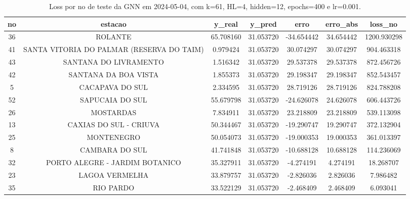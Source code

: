\begin{table}[h]
\centering
\caption{Loss por no de teste da GNN em 2024-05-04, com k=61, HL=4, hidden=12, epochs=400 e lr=0.001.}
\label{tab:gnn_loss_k61_hl4_h12_e400_d20240504}
\begin{tabular}{ccccccc}
\toprule
no & estacao & y\_real & y\_pred & erro & erro\_abs & loss\_no \\
\midrule
36 & ROLANTE & 65.708160 & 31.053720 & -34.654442 & 34.654442 & 1200.930298 \\
41 & SANTA VITORIA DO PALMAR (RESERVA DO TAIM) & 0.979424 & 31.053720 & 30.074297 & 30.074297 & 904.463318 \\
43 & SANTANA DO LIVRAMENTO & 1.516342 & 31.053720 & 29.537378 & 29.537378 & 872.456726 \\
42 & SANTANA DA BOA VISTA & 1.855373 & 31.053720 & 29.198347 & 29.198347 & 852.543457 \\
5 & CACAPAVA DO SUL & 2.334595 & 31.053720 & 28.719126 & 28.719126 & 824.788208 \\
52 & SAPUCAIA DO SUL & 55.679798 & 31.053720 & -24.626078 & 24.626078 & 606.443726 \\
26 & MOSTARDAS & 7.834911 & 31.053720 & 23.218809 & 23.218809 & 539.113098 \\
13 & CAXIAS DO SUL - CRIUVA & 50.344467 & 31.053720 & -19.290747 & 19.290747 & 372.132904 \\
25 & MONTENEGRO & 50.054073 & 31.053720 & -19.000353 & 19.000353 & 361.013397 \\
8 & CAMBARA DO SUL & 41.741848 & 31.053720 & -10.688128 & 10.688128 & 114.236069 \\
32 & PORTO ALEGRE - JARDIM BOTANICO & 35.327911 & 31.053720 & -4.274191 & 4.274191 & 18.268707 \\
23 & LAGOA VERMELHA & 33.879757 & 31.053720 & -2.826036 & 2.826036 & 7.986482 \\
35 & RIO PARDO & 33.522129 & 31.053720 & -2.468409 & 2.468409 & 6.093041 \\
\bottomrule
\end{tabular}
\end{table}

